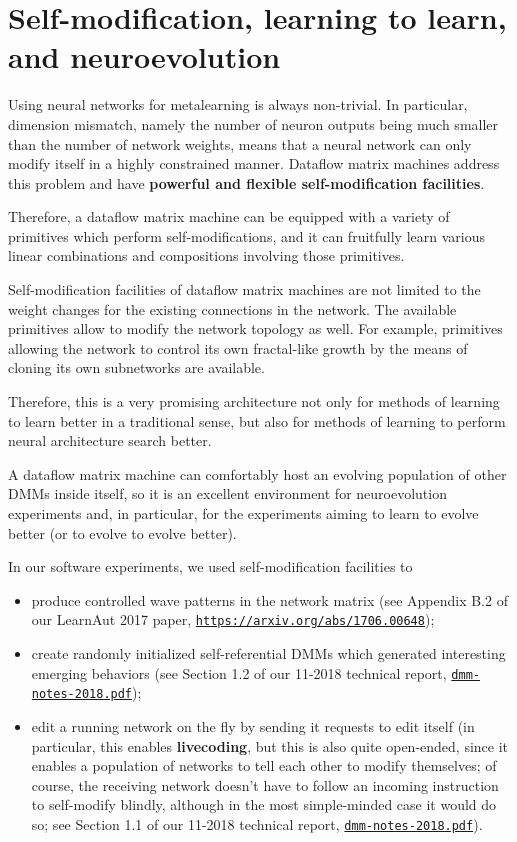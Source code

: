 \documentclass{article}
\begin{document}
\section{Self-modification, learning to learn, and neuroevolution} \label{sec:selfref}

Using neural networks for metalearning
is always non-trivial. In particular, dimension mismatch, namely the number of neuron outputs 
being much smaller than the number of network weights,
means that a neural network
can only modify itself in a highly constrained manner. Dataflow matrix machines address
this problem and have {\bf powerful and flexible self-modification facilities}.

Therefore, a dataflow matrix machine can be equipped with a variety of primitives
which perform self-modifications, and it can fruitfully learn various linear combinations and
compositions involving those primitives.

Self-modification facilities of dataflow matrix machines are not limited to the weight
changes for the existing connections in the network. The available primitives allow to
modify the network topology as well. For example, primitives allowing the network
to control its own fractal-like growth by the means of cloning its own subnetworks
are available.

Therefore, this is a very promising architecture not only for methods of learning to learn
better in a traditional sense, but also for methods of learning to perform
neural architecture search better. 

A dataflow matrix machine can comfortably host
an evolving population of other DMMs inside itself, so it is
an excellent environment for neuroevolution experiments and, in particular,
for the experiments aiming to learn to evolve better (or to evolve to evolve better).

\vspace{0.1in}
\noindent
In our software experiments, we used self-modification facilities to

  \begin{itemize}
     \item produce controlled wave patterns in the network matrix (see Appendix B.2 of our LearnAut 2017 paper, \href{https://arxiv.org/abs/1706.00648}{\tt https://arxiv.org/abs/1706.00648});
     \item create randomly initialized self-referential DMMs which generated interesting emerging behaviors (see Section 1.2 of our 11-2018 technical report, \href{https://www.cs.brandeis.edu/~bukatin/dmm-notes-2018.pdf}{\tt dmm-notes-2018.pdf});
     \item edit a running network on the fly by sending it requests to edit itself (in particular, this enables {\bf livecoding}, but this is also quite open-ended, since it enables a population of networks to tell each other to modify themselves; of course, the receiving network doesn't have to follow an incoming instruction to self-modify blindly, although in the most simple-minded case it would do so; see Section 1.1 of our 11-2018 technical report, \href{https://www.cs.brandeis.edu/~bukatin/dmm-notes-2018.pdf}{\tt dmm-notes-2018.pdf}).
  \end{itemize}
\end{document}
